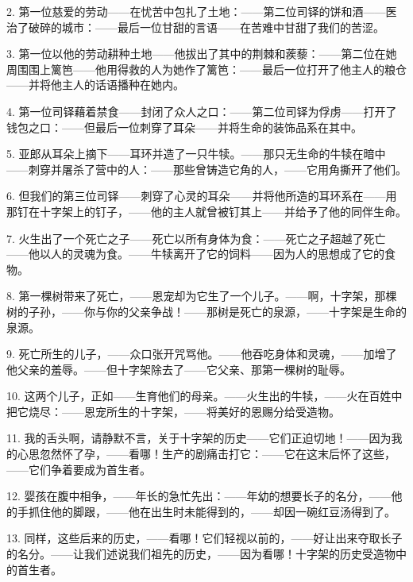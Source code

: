 2. 第一位慈爱的劳动——在忧苦中包扎了土地：——第二位司铎的饼和酒——医治了破碎的城市：——最后一位甘甜的言语——在苦难中甘甜了我们的苦涩。\par

3. 第一位以他的劳动耕种土地——他拔出了其中的荆棘和蒺藜：——第二位在她周围围上篱笆——他用得救的人为她作了篱笆：——最后一位打开了他主人的粮仓——并将他主人的话语播种在她内。\par

4. 第一位司铎藉着禁食——封闭了众人之口：——第二位司铎为俘虏——打开了钱包之口：——但最后一位刺穿了耳朵——并将生命的装饰品系在其中。\par

5. 亚郎从耳朵上摘下——耳环并造了一只牛犊。——那只无生命的牛犊在暗中——刺穿并屠杀了营中的人：——那些曾铸造它角的人，——它用角撕开了他们。\par

6. 但我们的第三位司铎——刺穿了心灵的耳朵——并将他所造的耳环系在——用那钉在十字架上的钉子，——他的主人就曾被钉其上——并给予了他的同伴生命。\par

7. 火生出了一个死亡之子——死亡以所有身体为食：——死亡之子超越了死亡——他以人的灵魂为食。——牛犊离开了它的饲料——因为人的思想成了它的食物。\par

8. 第一棵树带来了死亡，——恩宠却为它生了一个儿子。——啊，十字架，那棵树的子孙，——你与你的父亲争战！——那树是死亡的泉源，——十字架是生命的泉源。\par

9. 死亡所生的儿子，——众口张开咒骂他。——他吞吃身体和灵魂，——加增了他父亲的羞辱。——但十字架除去了——它父亲、那第一棵树的耻辱。\par

10. 这两个儿子，正如——生育他们的母亲。——火生出的牛犊，——火在百姓中把它烧尽：——恩宠所生的十字架，——将美好的恩赐分给受造物。\par

11. 我的舌头啊，请静默不言，关于十字架的历史——它们正迫切地！——因为我的心思忽然怀了孕，——看哪！生产的剧痛击打它：——它在这末后怀了这些，——它们争着要成为首生者。\par

12. 婴孩在腹中相争，——年长的急忙先出：——年幼的想要长子的名分，——他的手抓住他的脚跟，——他在出生时未能得到的，——却因一碗红豆汤得到了。\par

13. 同样，这些后来的历史，——看哪！它们轻视以前的，——好让出来夺取长子的名分。——让我们述说我们祖先的历史，——因为看哪！十字架的历史受造物中的首生者。\par


